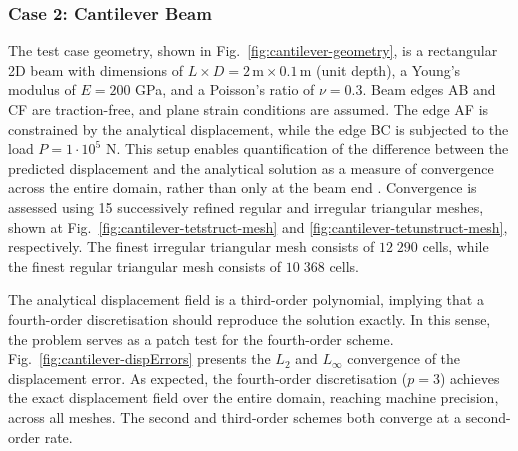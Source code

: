 \documentclass[review,3p]{elsarticle}
\begin{document}
\subsubsection{Case 2: Cantilever Beam}
\label{case:cantilever_beam}
%
The test case geometry, shown in Fig.~\ref{fig:cantilever-geometry}, is a rectangular 2D beam with dimensions of $L\times D=2\,\text{m}\times0.1\,\text{m}$ (unit depth), a Young’s modulus of $E = 200$ GPa, and a Poisson’s ratio of $\nu = 0.3$. Beam edges AB and CF are traction-free, and plane strain conditions are assumed. The edge AF is constrained by the analytical displacement, while the edge BC is subjected to the load $P=1 \cdot 10^{5}$ N. This setup enables quantification of the difference between the predicted displacement and the analytical solution as a measure of convergence across the entire domain, rather than only at the beam end \cite{augarde2008}. Convergence is assessed using 15 successively refined regular and irregular triangular meshes, shown at Fig.~\ref{fig:cantilever-tetstruct-mesh} and \ref{fig:cantilever-tetunstruct-mesh}, respectively. The finest irregular triangular mesh consists of $12\;290$ cells, while the finest regular triangular mesh consists of $10\;368$ cells.
%

The analytical displacement field is a third-order polynomial, implying that a fourth-order discretisation should reproduce the solution exactly. In this sense, the problem serves as a patch test for the fourth-order scheme. Fig.~\ref{fig:cantilever-dispErrors} presents the $L_2$ and $L_\infty$ convergence of the displacement error. As expected, the fourth-order discretisation ($p=3$) achieves the exact displacement field over the entire domain, reaching machine precision, across all meshes. The second and third-order schemes both converge at a second-order rate.
\end{document}
